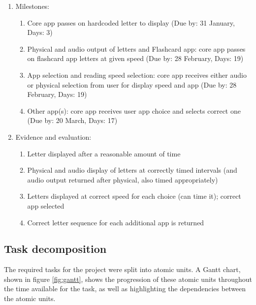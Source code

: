 \documentclass{article}
\begin{document}
\begin{enumerate}
  \item Milestones:
  \begin{enumerate}
    \item Core app passes on hardcoded letter to display (Due by: 31 January, Days: 3)
    \item Physical and audio output of letters and Flashcard app: core app passes on flashcard app letters at given speed (Due by: 28 February, Days: 19)
    \item App selection and reading speed selection: core app receives either audio or physical selection from user for display speed and app (Due by: 28 February, Days: 19)
    \item Other app(s): core app receives user app choice and selects correct one (Due by: 20 March, Days: 17)
  \end{enumerate}
  \item Evidence and evaluation:
  \begin{enumerate}
    \item Letter displayed after a reasonable amount of time
    \item Physical and audio display of letters at correctly timed intervals (and audio output returned after physical, also timed appropriately)
    \item Letters displayed at correct speed for each choice (can time it); correct app selected
    \item Correct letter sequence for each additional app is returned
  \end{enumerate}
\end{enumerate}


\subsection{Task decomposition}

The required tasks for the project were split into atomic units. A Gantt chart, shown in figure \ref{fig:gantt}, shows the progression of these atomic units throughout the time available for the task, as well as highlighting the dependencies between the atomic units.
\end{document}
